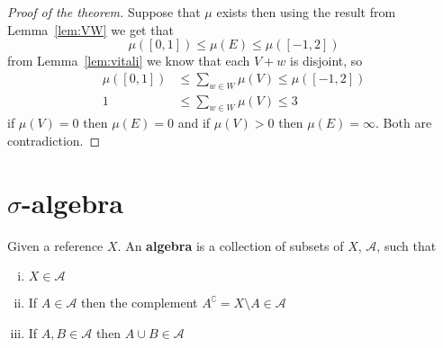 \begin{proof}[Proof of the theorem]
  Suppose that $\mu$ exists then using the result from Lemma~\ref{lem:VW} we get that  
  \[ \mu([0, 1]) \leq \mu\left(E\right) \leq \mu([-1, 2])\]
  from Lemma~\ref{lem:vitali} we know that each $V+w$ is disjoint, so
  \begin{align*}
    \mu([0, 1]) &\leq \sum_{w \in W}\mu(V) \leq \mu([-1, 2])\\
    1 &\leq \sum_{w \in W}\mu(V) \leq 3
  \end{align*}
  if $\mu(V) = 0$ then $\mu(E) = 0$ and if $\mu(V) > 0$ then $\mu(E) = \infty$. Both are contradiction. 
\end{proof}

\section{$\sigma$-algebra}

\begin{definition}
  Given a reference $X$. An \textbf{algebra} is a collection of subsets of $X$, $\mathcal{A}$, such that
  \begin{enumerate}[(i)]
    \item $X \in \mathcal{A}$
    \item If $A \in \mathcal{A}$ then the complement $A^\complement = X \setminus A \in \mathcal{A}$
    \item If $A, B \in \mathcal{A}$ then $A \cup B \in \mathcal{A}$
  \end{enumerate}
\end{definition}

